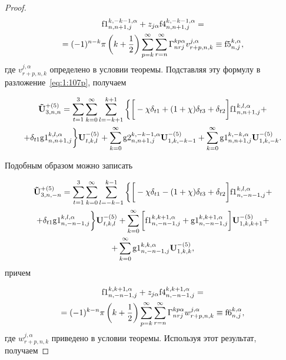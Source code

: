 \begin{proof}
\begin{multline*}
{\rm f1}_{n,n+1,j}^{k,-k-1,\alpha}+z_{j\alpha}{\rm f4}_{n,n+1,j}^{k,-k-1,\alpha}= \\
=(-1)^{n-k}\pi \left( {k + \frac{1}{2}} \right)\sum\limits_{p = k}^\infty  \sum\limits_{r = n}^\infty\Gamma _{nrj}^{kp\alpha }v_{r+p,n,k}^{j,\alpha}\equiv{\rm f5}_{n,j}^{k,\alpha},
\end{multline*}
где $v_{r+p,n,k}^{j,\alpha}$ определено в условии теоремы. Подставляя эту формулу в разложение~\eqref{eq:1:107p}, получаем

\begin{multline}
\mathbf{\tilde U}_{3,n,n}^{+(5)}=\sum\limits_{t=1}^3\sum\limits_{k=0}^\infty\sum\limits_{l=-k+1}^{k+1}\bigg\{\bigg\lbrack-\chi\delta_{t1}+(1+\chi)\delta_{t3}+\delta_{t2}\bigg\rbrack{\rm f1}_{n,n+1,j}^{k,l,\alpha}+ \\
+\delta_{t1}{\rm g1}_{n,n+1,j}^{k,l,\alpha}\bigg\}\mathbf{U}_{t,k,l}^{-(5)}+\sum\limits_{k=0}^\infty{\rm g2}_{n,n+1,j}^{k,-k-1,\alpha}\mathbf{U}_{1,k,-k-1}^{-(5)}+\sum\limits_{k=0}^\infty{\rm g1}_{n,n+1,j}^{k,-k,\alpha}\mathbf{U}_{1,k,-k}^{-(5)}.
\label{eq:1:109p}
\end{multline}

Подобным образом можно записать

\begin{multline}
\mathbf{\tilde U}_{3,n,-n}^{+(5)}=\sum\limits_{t=1}^3\sum\limits_{k=0}^\infty\sum\limits_{l=-k-1}^{k-1}\bigg\{\bigg\lbrack-\chi\delta_{t1}-(1+\chi)\delta_{t3}+\delta_{t2}\bigg\rbrack{\rm f1}_{n,-n-1,j}^{k,l,\alpha}+ \\
+\delta_{t1}{\rm g1}_{n,-n-1,j}^{k,l,\alpha}\bigg\}\mathbf{U}_{t,k,l}^{-(5)}+\sum\limits_{k=0}^\infty\bigg\lbrack{\rm f1}_{n,-n-1,j}^{k,k+1,\alpha}+{\rm g1}_{n,-n-1,j}^{k,k+1,\alpha}\bigg\rbrack\mathbf{U}_{1,k,k+1}^{-(5)}+ \\
+\sum\limits_{k=0}^\infty{\rm g1}_{n,-n-1,j}^{k,k,\alpha}\mathbf{U}_{1,k,k}^{-(5)},
\label{eq:1:110p}
\end{multline}
причем

\begin{multline*}
{\rm f1}_{n,-n-1,j}^{k,k+1,\alpha}+z_{j\alpha}{\rm f4}_{n,-n-1,j}^{k,k+1,\alpha}= \\
=(-1)^{k-n}\pi\left( {k+\frac{1}{2}} \right)\sum\limits_{p = k}^\infty  \sum\limits_{r = n}^\infty\Gamma _{nrj}^{kp\alpha }w_{r+p,n,k}^{j,\alpha}\equiv{\rm f6}_{n,j}^{k,\alpha},
\end{multline*}
где $w_{r+p,n,k}^{j,\alpha}$ приведено в условии теоремы. Используя этот результат, получаем


\end{proof}
